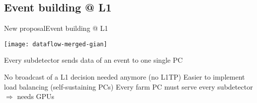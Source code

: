 \subsection{Event building @ L1}
\begin{frame}{New proposal}{Event building @ L1}
	\begin{center} 
		\texttt{[image: dataflow-merged-gian]}
	\end{center} 
	
	\begin{block}{Every subdetector sends data of an event to one single PC}
		\begin{itemize}
		  	\pro No broadcast of a L1 decision needed anymore (no L1TP)
		  	\pro Easier to implement load balancing (self-sustaining PCs)
  			\contra Every farm PC must serve every subdetector $\Rightarrow$ needs GPUs
		\end{itemize}
	\end{block}
\end{frame}
